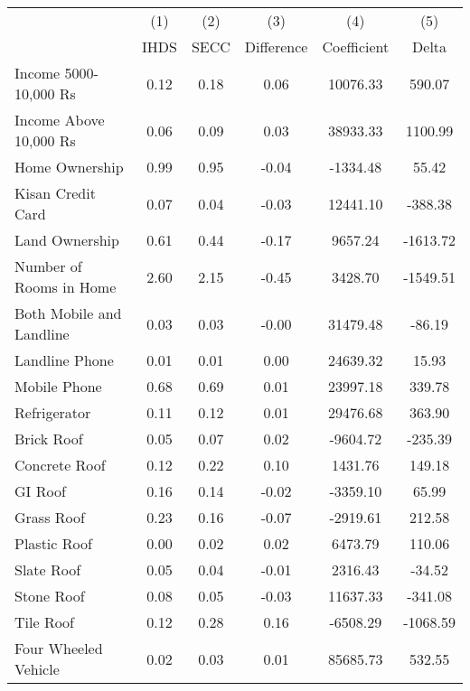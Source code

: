 \begin{tabular}{lccccc}
\hline\hline & (1) & (2) & (3) & (4) & (5) \\
 & IHDS & SECC & Difference & Coefficient & Delta \\
\hline
Income 5000-10,000 Rs &       0.12 &       0.18 &       0.06 &   10076.33 &     590.07 \\
Income Above 10,000 Rs &       0.06 &       0.09 &       0.03 &   38933.33 &    1100.99 \\
      Home Ownership &       0.99 &       0.95 &      -0.04 &   -1334.48 &      55.42 \\
   Kisan Credit Card &       0.07 &       0.04 &      -0.03 &   12441.10 &    -388.38 \\
      Land Ownership &       0.61 &       0.44 &      -0.17 &    9657.24 &   -1613.72 \\
Number of Rooms in Home &       2.60 &       2.15 &      -0.45 &    3428.70 &   -1549.51 \\
Both Mobile and Landline &       0.03 &       0.03 &      -0.00 &   31479.48 &     -86.19 \\
      Landline Phone &       0.01 &       0.01 &       0.00 &   24639.32 &      15.93 \\
        Mobile Phone &       0.68 &       0.69 &       0.01 &   23997.18 &     339.78 \\
        Refrigerator &       0.11 &       0.12 &       0.01 &   29476.68 &     363.90 \\
          Brick Roof &       0.05 &       0.07 &       0.02 &   -9604.72 &    -235.39 \\
       Concrete Roof &       0.12 &       0.22 &       0.10 &    1431.76 &     149.18 \\
             GI Roof &       0.16 &       0.14 &      -0.02 &   -3359.10 &      65.99 \\
          Grass Roof &       0.23 &       0.16 &      -0.07 &   -2919.61 &     212.58 \\
        Plastic Roof &       0.00 &       0.02 &       0.02 &    6473.79 &     110.06 \\
          Slate Roof &       0.05 &       0.04 &      -0.01 &    2316.43 &     -34.52 \\
          Stone Roof &       0.08 &       0.05 &      -0.03 &   11637.33 &    -341.08 \\
           Tile Roof &       0.12 &       0.28 &       0.16 &   -6508.29 &   -1068.59 \\
Four Wheeled Vehicle &       0.02 &       0.03 &       0.01 &   85685.73 &     532.55 \\

\end{tabular}
